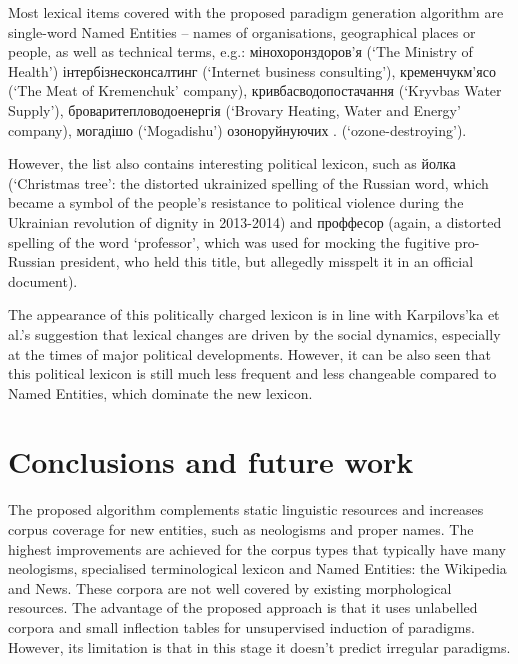 \documentclass[11pt,a4paper]{article}
\begin{document}
Most lexical items covered with the proposed paradigm generation algorithm are single-word Named Entities -- names of organisations, geographical places or people, as well as technical terms, e.g.: мінохоронздоров'я  (`The Ministry of Health') 
інтербізнесконсалтинг  (`Internet business consulting'), кременчукм'ясо  (`The Meat of Kremenchuk' company), кривбасводопостачання  (`Kryvbas Water Supply'), броваритепловодоенергія  (`Brovary Heating, Water and Energy' company), могадішо  (`Mogadishu')
озоноруйнуючих . (`ozone-destroying'). 

However, the list also contains interesting political lexicon, such as йолка  (`Christmas tree': the distorted ukrainized spelling of the Russian word, which became a symbol of the people's resistance to political violence during the Ukrainian revolution of dignity in 2013-2014) and проффесор  (again, a distorted spelling of the word `professor', which was used for mocking the fugitive pro-Russian president, who held this title, but allegedly misspelt it in an official document). 

The appearance of this politically charged lexicon is in line with Karpilovs'ka et al.'s  suggestion that lexical changes are driven by the social dynamics, especially at the times of major political developments. However, it can be also seen that this political lexicon is still much less frequent and less changeable compared to Named Entities, which dominate the new lexicon.


\section{Conclusions and future work}
\label{sec:Conclusions}

The proposed algorithm complements static linguistic resources and increases corpus coverage for new entities, such as neologisms and proper names. The highest improvements are achieved for the corpus types that typically have many neologisms, specialised terminological lexicon and Named Entities: the Wikipedia and News. These corpora are not well covered by existing morphological resources. The advantage of the proposed approach is that it uses unlabelled corpora and small inflection tables for unsupervised induction of paradigms. However, its limitation is that in this stage it doesn't predict irregular paradigms. 
\end{document}
